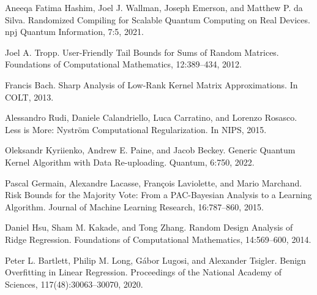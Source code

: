\documentclass{article}
\begin{document}
\begin{thebibliography}{99}
Aneeqa Fatima Hashim, Joel J. Wallman, Joseph Emerson, and Matthew P. da Silva. Randomized Compiling for Scalable Quantum Computing on Real Devices. npj Quantum Information, 7:5, 2021.

Joel A. Tropp. User-Friendly Tail Bounds for Sums of Random Matrices. Foundations of Computational Mathematics, 12:389–434, 2012.

Francis Bach. Sharp Analysis of Low-Rank Kernel Matrix Approximations. In COLT, 2013.

Alessandro Rudi, Daniele Calandriello, Luca Carratino, and Lorenzo Rosasco. Less is More: Nyström Computational Regularization. In NIPS, 2015.

Oleksandr Kyriienko, Andrew E. Paine, and Jacob Beckey. Generic Quantum Kernel Algorithm with Data Re-uploading. Quantum, 6:750, 2022.

Pascal Germain, Alexandre Lacasse, François Laviolette, and Mario Marchand. Risk Bounds for the Majority Vote: From a PAC-Bayesian Analysis to a Learning Algorithm. Journal of Machine Learning Research, 16:787–860, 2015.

Daniel Hsu, Sham M. Kakade, and Tong Zhang. Random Design Analysis of Ridge Regression. Foundations of Computational Mathematics, 14:569–600, 2014.

Peter L. Bartlett, Philip M. Long, G\'abor Lugosi, and Alexander Tsigler. Benign Overfitting in Linear Regression. Proceedings of the National Academy of Sciences, 117(48):30063–30070, 2020.

\end{thebibliography}
\end{document}
